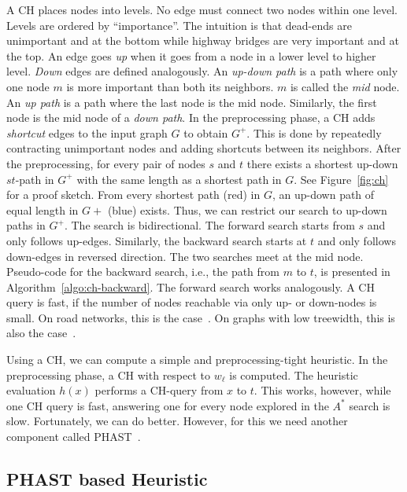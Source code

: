 \documentclass[a4paper,USenglish,cleveref, autoref, thm-restate]{lipics-v2019}
\begin{document}
A CH places nodes into levels.
No edge must connect two nodes within one level.
Levels are ordered by ``importance''.
The intuition is that dead-ends are unimportant and at the bottom while highway bridges are very important and at the top.
An edge goes \emph{up} when it goes from a node in a lower level to higher level.
\emph{Down} edges are defined analogously.
An \emph{up-down path} is a path where only one node $m$ is more important than both its neighbors.
$m$ is called the \emph{mid} node.
An \emph{up path} is a path where the last node is the mid node.
Similarly, the first node is the mid node of a \emph{down path}.
%
In the preprocessing phase, a CH adds \emph{shortcut} edges to the input graph $G$ to obtain $G^+$.
This is done by repeatedly contracting unimportant nodes and adding shortcuts between its neighbors.
After the preprocessing, for every pair of nodes $s$ and $t$ there exists a shortest up-down $st$-path in $G^+$ with the same length as a shortest path in $G$.
See Figure~\ref{fig:ch} for a proof sketch.
From every shortest path (red) in $G$, an up-down path of equal length in $G+$ (blue) exists.
Thus, we can restrict our search to up-down paths in $G^+$.
The search is bidirectional.
The forward search starts from $s$ and only follows up-edges.
Similarly, the backward search starts at $t$ and only follows down-edges in reversed direction.
The two searches meet at the mid node.
Pseudo-code for the backward search, i.e., the path from $m$ to $t$, is presented in Algorithm~\ref{algo:ch-backward}.
The forward search works analogously.
%
A CH query is fast, if the number of nodes reachable via only up- or down-nodes is small.
On road networks, this is the case~\cite{gssv-erlrn-12,dgrw-gpnc-11,dgpw-crprn-13}.
On graphs with low treewidth, this is also the case~\cite{dsw-cch-15,hs-gbpo-18}.

Using a CH, we can compute a simple and preprocessing-tight heuristic.
In the preprocessing phase, a CH with respect to $w_\ell$ is computed.
The heuristic evaluation $h(x)$ performs a CH-query from $x$ to $t$.
%
This works, however, while one CH query is fast, answering one for every node explored in the $A^*$ search is slow.
Fortunately, we can do better.
However, for this we need another component called PHAST~\cite{dgnw-phast-13}.

\subsection{PHAST based Heuristic}
\end{document}
